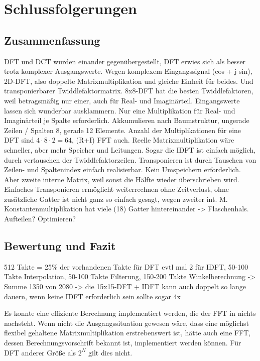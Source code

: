  
 \chapter{Schlussfolgerungen}
 \section{Zusammenfassung}
 DFT und DCT wurden einander gegenübergestellt, DFT erwies sich als besser trotz komplexer Ausgangswerte. Wegen komplexem Eingangssignal (cos + j sin), 2D-DFT, also 
 doppelte Matrixmultiplikation und gleiche Einheit für beides. Und transponierbarer Twiddlefaktormatrix.
 8x8-DFT hat die besten Twiddlefaktoren, weil betragsmäßig nur einer, auch für Real- und Imaginärteil. Eingangswerte lassen sich wunderbar ausklammern.
 Nur eine Multiplikation für Real- und Imaginärteil je Spalte erforderlich. Akkumulieren nach Baumstruktur, ungerade Zeilen / Spalten 8, gerade 12 Elemente.
 Anzahl der Multiplikationen für eine DFT sind $4\cdot8\cdot2=64$, (R+I) FFT auch.
 Reelle Matrixmultiplikation wäre schneller, aber mehr Speicher und Leitungen.
 Sogar die IDFT ist einfach möglich, durch vertauschen der Twiddlefaktorzeilen.
 Transponieren ist durch Tauschen von Zeilen- und Spaltenindex einfach realisierbar. Kein Umspeichern erforderlich. Aber zweite interne Matrix, weil sonst die Hälfte wieder überschrieben wird.
 Einfaches Transponieren ermöglicht weiterrechnen ohne Zeitverlust, ohne zusätzliche Gatter ist nicht ganz so einfach gesagt, wegen zweiter int. M.
 Konstantenmultiplikation hat viele (18) Gatter hintereinander -> Flaschenhals. Aufteilen? Optimieren?
 
 
 
 \section{Bewertung und Fazit}
 512 Takte = 25\% der vorhandenen Takte für DFT evtl mal 2 für IDFT, 50-100 Takte Interpolation, 50-100 Takte Filterung, 150-200 Takte Winkelberechnung -> Summe 1350 von 2080 
 -> die 15x15-DFT + IDFT kann auch doppelt so lange dauern, wenn keine IDFT erforderlich sein sollte sogar 4x
 
 
 Es konnte eine effiziente Berechnung implementiert werden, die der FFT in nichts nachsteht. Wenn nicht die Ausgangssituation gewesen wäre, dass eine möglichst flexibel gehaltene
 Matrixmultiplikation erstrebenswert ist, hätte auch eine FFT, dessen Berechnungsvorschrift bekannt ist, implementiert werden können. Für DFT anderer Größe als $2^N$ gilt dies nicht.
 
